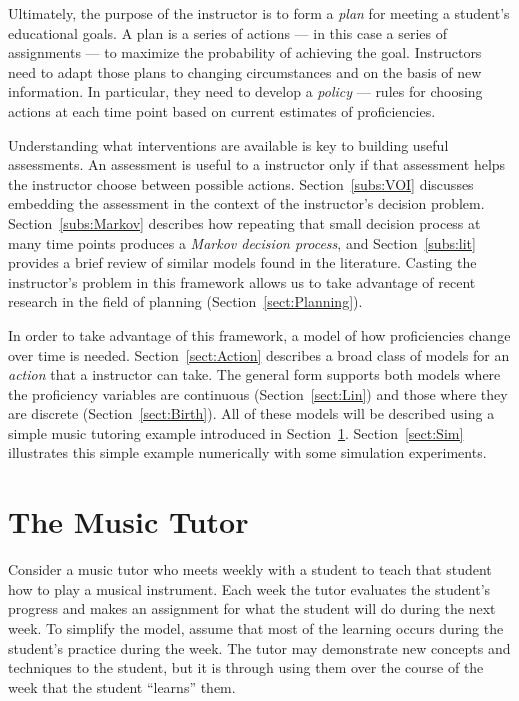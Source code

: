 \documentclass[12pt]{RR-article}
\begin{document}
Ultimately, the purpose of the instructor is to form a \textit{plan\/}
for meeting a student's educational goals.  A plan is a series of
actions --- in this case a series of assignments --- to maximize the
probability of achieving the goal.  Instructors need to adapt those
plans to changing circumstances and on the basis of new information.
In particular, they need to develop a \textit{policy\/} --- rules
for choosing actions at each time point based on current estimates of
proficiencies.

Understanding what interventions are available is key to building
useful assessments.  An assessment is useful to a instructor only if that
assessment helps the instructor choose between possible actions.
Section~\ref{subs:VOI} discusses embedding the assessment in the
context of the instructor's decision problem.  Section~\ref{subs:Markov}
describes how repeating that small decision process at many time
points produces a \textit{Markov decision process\/}, and
Section~\ref{subs:lit} provides a
brief review of similar models found in the literature.  Casting the
instructor's problem in this framework allows us to take advantage of
recent research in the field of planning
(Section~\ref{sect:Planning}).

In order to take advantage of this framework, a model of how
proficiencies change over time is needed.  Section~\ref{sect:Action}
describes a broad class of models for an \textit{action\/} that a
instructor can take.  The general form supports both models where the
proficiency variables are continuous (Section~\ref{sect:Lin}) and
those where they are discrete (Section~\ref{sect:Birth}).  All of
these models will be described using a simple music tutoring example
introduced in Section~\ref{sect:Music}.  Section~\ref{sect:Sim}
illustrates this simple example numerically with some simulation
experiments.


\section{The Music Tutor}
\label{sect:Music}

Consider a music tutor who meets weekly with a student to teach that
student how to play a musical instrument.  Each week the tutor
evaluates the student's progress and makes an assignment for what the
student will do during the next week.  To simplify the model, assume
that most of the learning occurs during the student's practice during
the week.  The tutor may demonstrate new concepts and techniques to
the student, but it is through using them over the course of the week
that the student ``learns'' them.
\end{document}
